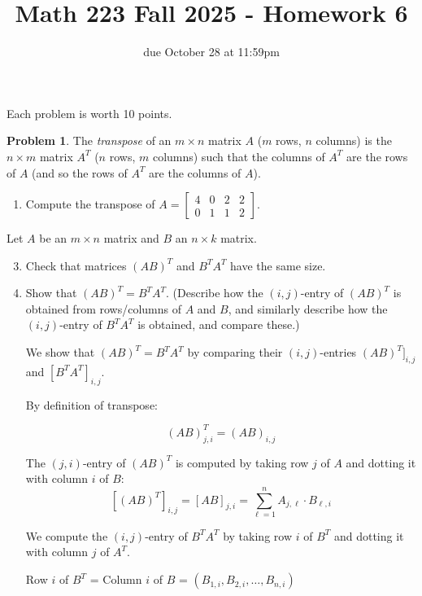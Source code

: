 \documentclass[12pt, oneside]{amsart}
\title{Math 223 Fall 2025 - Homework 6}
\author{due October 28 at 11:59pm}
\theoremstyle{definition}
\newtheorem{prob}{Problem}
\begin{document}
\maketitle
Each problem is worth 10 points.

\begin{prob}
    The \emph{transpose} of an $m\times n$ matrix $A$ ($m$ rows, $n$ columns) is the $n\times m$ matrix $A^T$ ($n$ rows, $m$ columns) such that the columns of $A^T$ are the rows of $A$ (and so the rows of $A^T$ are the columns of $A$).

    \begin{enumerate}
        \item Compute the transpose of $A = \left[\begin{matrix}
        4 & 0 & 2 & 2 \\
        0 & 1 & 1 & 2
        \end{matrix}\right]$.
    \end{enumerate}
    Let $A$ be an $m\times n$ matrix and $B$ an $n\times k$ matrix.
    \begin{enumerate}
    \setcounter{enumi}{2}
    \item Check that matrices $(AB)^T$ and $B^T A^T$ have the same size.
    \item Show that $(AB)^T = B^T A^T$. 
    (Describe how the $(i,j)$-entry of $(AB)^T$ is obtained from rows/columns of $A$ and $B$, and similarly describe how the $(i,j)$-entry of $B^T A^T$ is obtained, and compare these.)
    
    \begin{solution}
    We show that $(AB)^T = B^T A^T$ by comparing their $(i,j)$-entries $(AB)^T]_{i,j}$ and $[B^T A^T]_{i,j}$.
    
    \vspace{0.3cm}
    
    By definition of transpose:
    
    \[
    (AB)^T_{j,i} = (A B)_{i,j}
    \]
    
    The $(j,i)$-entry of $(AB)^T$ is computed by taking row $j$ of $A$ and dotting it with column $i$ of $B$:
    \[
    [(AB)^T]_{i,j} = [AB]_{j,i} = \sum_{\ell=1}^{n} A_{j,\ell} \cdot B_{\ell,i}
    \]
    
    \vspace{0.3cm}
    
    We compute the $(i,j)$-entry of $B^T A^T$ by taking row $i$ of $B^T$ and dotting it with column $j$ of $A^T$. 
    
    \hspace{2em} Row $i$ of $B^T$ = Column $i$ of $B$ = $(B_{1,i}, B_{2,i}, \ldots, B_{n,i})$


\end{solution}
\end{enumerate}
\end{prob}
\end{document}
